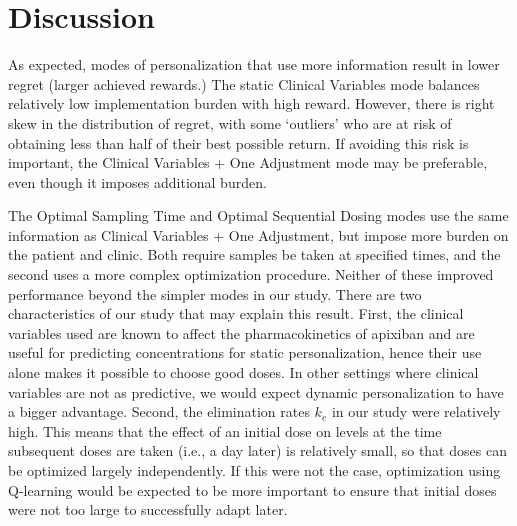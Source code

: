  \section{Discussion}\label{ss:discussion}




As expected, modes of personalization that use more information result in lower regret (larger achieved rewards.)  The static Clinical Variables mode balances relatively low implementation burden with high reward. However, there is right skew in the distribution of regret, with some `outliers' who are at risk of obtaining less than half of their best possible return. If avoiding this risk is important, the Clinical Variables + One Adjustment mode may be preferable, even though it imposes additional burden. 

The Optimal Sampling Time and Optimal Sequential Dosing modes use the same information as Clinical Variables + One Adjustment, but impose more burden on the patient and clinic. Both require samples be taken at specified times, and the second uses a more complex optimization procedure. Neither of these improved performance beyond the simpler modes in our study. There are two characteristics of our study that may explain this result. First, the clinical variables used are known to affect the pharmacokinetics of apixiban and are useful for predicting concentrations for static personalization, hence their use alone makes it possible to choose good doses. In other settings where clinical variables are not as predictive, we would expect dynamic personalization to have a bigger advantage. Second, the elimination rates $k_e$ in our study were relatively high. This means that the effect of an initial dose on levels at the time subsequent doses are taken (i.e., a day later) is relatively small, so that doses can be optimized largely independently. If this were not the case, optimization using Q-learning would be expected to be more important to ensure that initial doses were not too large to successfully adapt later.

